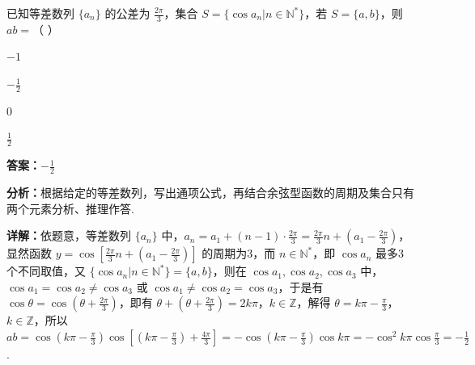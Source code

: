 \begin{question}[points=5]
已知等差数列 $\{a_n\}$ 的公差为 $\frac{2\pi}{3}$，集合 $S=\{\cos a_n|n\in\mathbb{N}^*\}$，若 $S=\{a,b\}$，则 $ab=$（ ）
\begin{choices}
  \item $-1$
  \item $-\frac{1}{2}$
  \item $0$
  \item $\frac{1}{2}$
\end{choices}
\begin{solution}
\textbf{答案：}$-\frac{1}{2}$

\textbf{分析：}根据给定的等差数列，写出通项公式，再结合余弦型函数的周期及集合只有两个元素分析、推理作答.

\textbf{详解：}依题意，等差数列 $\{a_n\}$ 中，$a_n=a_1+(n-1)\cdot\frac{2\pi}{3}=\frac{2\pi}{3}n+(a_1-\frac{2\pi}{3})$，显然函数 $y=\cos[\frac{2\pi}{3}n+(a_1-\frac{2\pi}{3})]$ 的周期为3，而 $n\in\mathbb{N}^*$，即 $\cos a_n$ 最多3个不同取值，又 $\{\cos a_n|n\in\mathbb{N}^*\}=\{a,b\}$，则在 $\cos a_1,\cos a_2,\cos a_3$ 中，$\cos a_1=\cos a_2\neq\cos a_3$ 或 $\cos a_1\neq\cos a_2=\cos a_3$，于是有 $\cos\theta=\cos(\theta+\frac{2\pi}{3})$，即有 $\theta+(\theta+\frac{2\pi}{3})=2k\pi$，$k\in\mathbb{Z}$，解得 $\theta=k\pi-\frac{\pi}{3}$，$k\in\mathbb{Z}$，所以 $ab=\cos(k\pi-\frac{\pi}{3})\cos[(k\pi-\frac{\pi}{3})+\frac{4\pi}{3}]=-\cos(k\pi-\frac{\pi}{3})\cos k\pi=-\cos^2 k\pi\cos\frac{\pi}{3}=-\frac{1}{2}$.
\end{solution}
\end{question}

